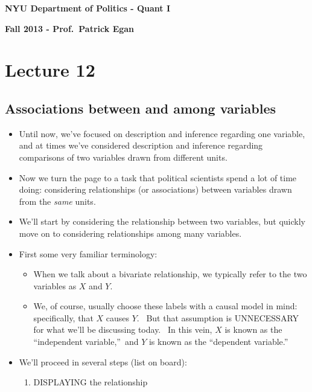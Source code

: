 \documentclass[11pt]{article}
\begin{document}
\singlespacing

\textbf{NYU Department of Politics - Quant I}

\textbf{Fall 2013 - Prof.\ Patrick Egan}

\doublespacing

\section{Lecture 12}

\subsection{Associations between and among variables}

\begin{itemize}
\item Until now, we've focused on description and inference regarding one
variable, and at times we've considered description and inference regarding
comparisons of two variables drawn from different units.

\item Now we turn the page to a task that political scientists spend a lot
of time doing: considering relationships (or associations) between variables
drawn from the \textit{same }units.

\item We'll start by considering the relationship between two variables, but
quickly move on to considering relationships among many variables.

\item First some very familiar terminology:

\begin{itemize}
\item When we talk about a bivariate relationship, we typically refer to the
two variables as $X$ and $Y.$ \ 

\item We, of course, usually choose these labels with a causal model in
mind: specifically, that $X$ causes $Y$. \ But that assumption is
UNNECESSARY for what we'll be discussing today. \ In this vein, $X$ is known
as the \textquotedblleft independent variable,\textquotedblright\ and $Y$ is
known as the \textquotedblleft dependent variable.\textquotedblright
\end{itemize}

\item We'll proceed in several steps (list on board):

\begin{enumerate}
\item DISPLAYING the relationship


\end{enumerate}
\end{itemize}
\end{document}
